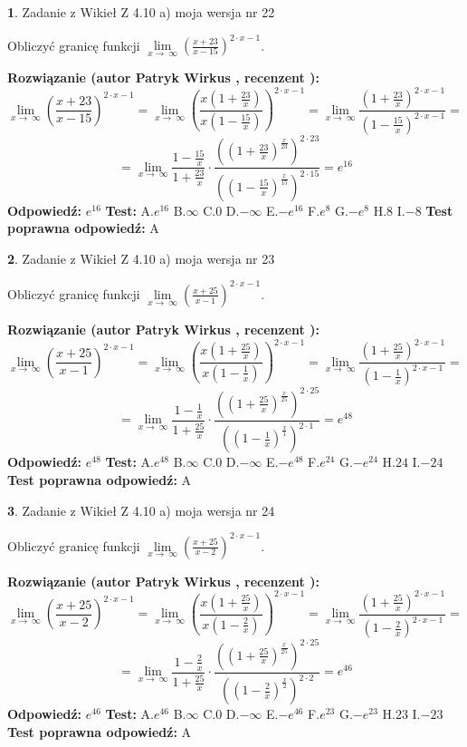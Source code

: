 \documentclass[12pt, a4paper]{article}
\theoremstyle{definition} %
\newtheorem{zad}{}
\newcommand{\zadStart}[1]{\begin{zad}#1\newline}
\newcommand{\zadStop}{\end{zad}}
\newcommand{\rozwStart}[2]{\noindent \textbf{Rozwiązanie (autor #1 , recenzent #2): }\newline}
\newcommand{\rozwStop}{\newline}
\newcommand{\odpStart}{\noindent \textbf{Odpowiedź:}\newline}
\newcommand{\odpStop}{\newline}
\newcommand{\testStart}{\noindent \textbf{Test:}\newline}
\newcommand{\testStop}{\newline}
\newcommand{\kluczStart}{\noindent \textbf{Test poprawna odpowiedź:}\newline}
\newcommand{\kluczStop}{\newline}
\begin{document}
\zadStart{Zadanie z Wikieł Z 4.10 a) moja wersja nr 22}

Obliczyć granicę funkcji  $\lim\limits_{x\to\ \infty}(\frac{x+23}{x-15})^{2\cdot x-1}$.
\zadStop
\rozwStart{Patryk Wirkus}{}
$$\lim\limits_{x\to\ \infty}(\frac{x+23}{x-15})^{2\cdot x-1} = \lim\limits_{x\to\ \infty}(\frac{x(1+\frac{23}{x})}{x(1-\frac{15}{x})})^{2\cdot x-1}=\lim\limits_{x\to\ \infty}\frac{(1+\frac{23}{x})^{2\cdot x-1}}{(1-\frac{15}{x})^{2\cdot x-1}}=$$
$$=\lim\limits_{x\to\ \infty}\frac{1-\frac{15}{x}}{1+\frac{23}{x}}\cdot\frac{((1+\frac{23}{x})^{\frac{x}{23}})^{2\cdot23}}{((1-\frac{15}{x})^{\frac{x}{15}})^{2\cdot15}}=e^{16}$$
\rozwStop
\odpStart
$e^{16}$
\odpStop
\testStart
A.$e^{16}$ B.$\infty$ C.$0$ D.$-\infty$ E.$-e^{16}$
F.$e^{8}$ G.$-e^{8}$
H.$8$
I.$-8$
\testStop
\kluczStart
A
\kluczStop



\zadStart{Zadanie z Wikieł Z 4.10 a) moja wersja nr 23}

Obliczyć granicę funkcji  $\lim\limits_{x\to\ \infty}(\frac{x+25}{x-1})^{2\cdot x-1}$.
\zadStop
\rozwStart{Patryk Wirkus}{}
$$\lim\limits_{x\to\ \infty}(\frac{x+25}{x-1})^{2\cdot x-1} = \lim\limits_{x\to\ \infty}(\frac{x(1+\frac{25}{x})}{x(1-\frac{1}{x})})^{2\cdot x-1}=\lim\limits_{x\to\ \infty}\frac{(1+\frac{25}{x})^{2\cdot x-1}}{(1-\frac{1}{x})^{2\cdot x-1}}=$$
$$=\lim\limits_{x\to\ \infty}\frac{1-\frac{1}{x}}{1+\frac{25}{x}}\cdot\frac{((1+\frac{25}{x})^{\frac{x}{25}})^{2\cdot25}}{((1-\frac{1}{x})^{\frac{x}{1}})^{2\cdot1}}=e^{48}$$
\rozwStop
\odpStart
$e^{48}$
\odpStop
\testStart
A.$e^{48}$ B.$\infty$ C.$0$ D.$-\infty$ E.$-e^{48}$
F.$e^{24}$ G.$-e^{24}$
H.$24$
I.$-24$
\testStop
\kluczStart
A
\kluczStop



\zadStart{Zadanie z Wikieł Z 4.10 a) moja wersja nr 24}

Obliczyć granicę funkcji  $\lim\limits_{x\to\ \infty}(\frac{x+25}{x-2})^{2\cdot x-1}$.
\zadStop
\rozwStart{Patryk Wirkus}{}
$$\lim\limits_{x\to\ \infty}(\frac{x+25}{x-2})^{2\cdot x-1} = \lim\limits_{x\to\ \infty}(\frac{x(1+\frac{25}{x})}{x(1-\frac{2}{x})})^{2\cdot x-1}=\lim\limits_{x\to\ \infty}\frac{(1+\frac{25}{x})^{2\cdot x-1}}{(1-\frac{2}{x})^{2\cdot x-1}}=$$
$$=\lim\limits_{x\to\ \infty}\frac{1-\frac{2}{x}}{1+\frac{25}{x}}\cdot\frac{((1+\frac{25}{x})^{\frac{x}{25}})^{2\cdot25}}{((1-\frac{2}{x})^{\frac{x}{2}})^{2\cdot2}}=e^{46}$$
\rozwStop
\odpStart
$e^{46}$
\odpStop
\testStart
A.$e^{46}$ B.$\infty$ C.$0$ D.$-\infty$ E.$-e^{46}$
F.$e^{23}$ G.$-e^{23}$
H.$23$
I.$-23$
\testStop
\kluczStart
A
\kluczStop
\end{document}
